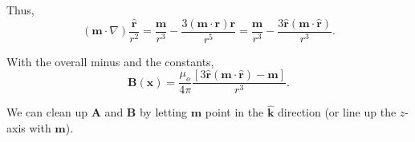 \documentclass{article}
\numberwithin{equation}{section}
\newcommand{\khat}{\mathbf{\hat{k}}}
\newcommand{\rhat}{\mathbf{\hat{r}}}
\begin{document}
\begin{mdframed}[backgroundcolor=WHITE,align=left,userdefinedwidth=45em, topline=false, rightline=false,frametitle={Optional Derivation}]
Thus,
\begin{equation*}
    \left( \bm{m} \cdot \nabla \right) \frac{\rhat}{r^2} = \frac{\bm{m}}{r^3} - \frac{3 \left( \bm{m} \cdot \bm{r} \right) \bm{r}}{r^5} = \frac{\bm{m}}{r^3} - \frac{3\rhat \left( \bm{m} \cdot \rhat \right)}{r^3}.
\end{equation*}

With the overall minus and the constants,
\begin{equation*}
    \bm{B}(\bm{x}) = \frac{\mu_o}{4\pi} \frac{\left[ 3 \rhat \left( \bm{m} \cdot \rhat \right) - \bm{m} \right]}{r^3}.
\end{equation*}

\end{mdframed}

\vspace{1cm}

We can clean up $\bm{A}$ and $\bm{B}$ by letting $\bm{m}$ point in the $\khat$ direction (or line up the $z$-axis with $\bm{m}$).
\end{document}
